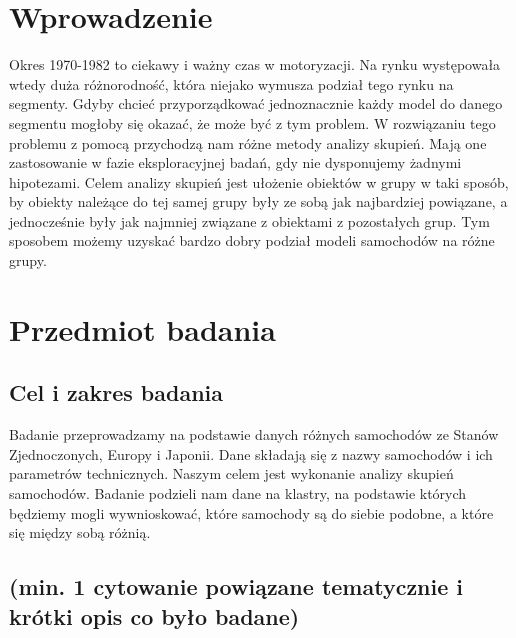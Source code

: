 \documentclass{article}
\begin{document}
\section{Wprowadzenie}
Okres 1970-1982 to ciekawy i ważny czas w motoryzacji. Na rynku występowała wtedy duża różnorodność, która niejako wymusza podział tego rynku na segmenty. Gdyby chcieć przyporządkować jednoznacznie każdy model do danego segmentu mogłoby się okazać, że może być z tym problem. W rozwiązaniu tego problemu z pomocą przychodzą nam różne metody analizy skupień. Mają one zastosowanie w fazie eksploracyjnej badań, gdy nie dysponujemy żadnymi hipotezami. Celem analizy skupień jest ułożenie obiektów w grupy w taki sposób, by obiekty należące do tej samej grupy były ze sobą jak najbardziej powiązane, a jednocześnie były jak najmniej związane z obiektami z pozostałych grup. Tym sposobem możemy uzyskać bardzo dobry podział modeli samochodów na różne grupy.
\section{Przedmiot badania}
    \subsection{Cel i zakres badania} 
    Badanie przeprowadzamy na podstawie danych różnych samochodów ze Stanów Zjednoczonych, Europy i Japonii. 
    Dane składają się z nazwy samochodów i ich parametrów technicznych.
    \newline\newline
    Naszym celem jest wykonanie analizy skupień samochodów. Badanie podzieli nam dane na klastry, na podstawie których będziemy mogli 
    wywnioskować, które samochody są do siebie podobne, a które się między sobą różnią. 
    \subsection{(min. 1 cytowanie powiązane tematycznie i krótki opis co było badane)}
\end{document}
